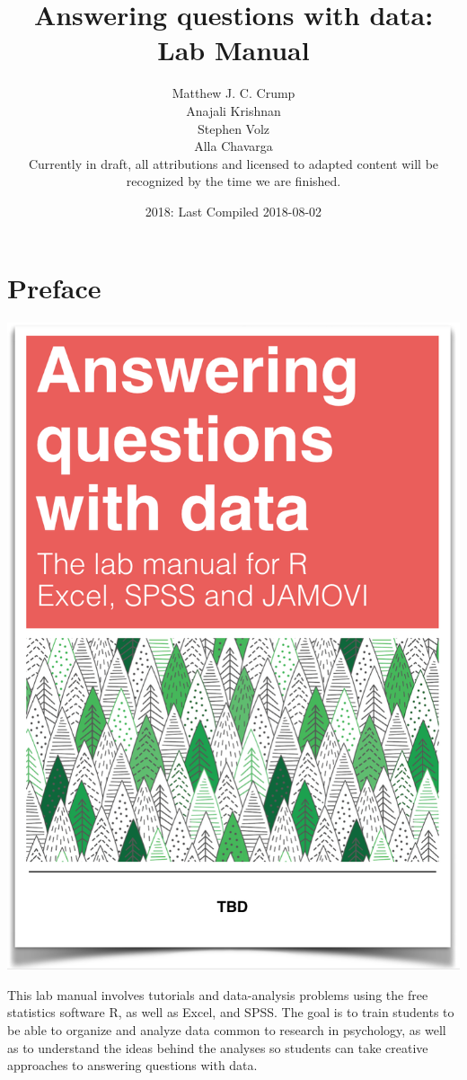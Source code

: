 \documentclass[]{book}
\title{Answering questions with data: Lab Manual}
\author{Matthew J. C. Crump \\ Anajali Krishnan \\ Stephen Volz \\ Alla Chavarga \\ Currently in draft, all attributions and licensed to adapted content
will be recognized by the time we are finished.}
\date{2018: Last Compiled 2018-08-02}
\theoremstyle{definition}
\theoremstyle{definition}
\theoremstyle{definition}
\theoremstyle{remark}
\begin{document}
\maketitle

{
\setcounter{tocdepth}{1}
\tableofcontents
}
\chapter*{Preface}\label{preface}

\begin{center}\includegraphics[width=12.5in]{LabmanualCover} \end{center}

This lab manual involves tutorials and data-analysis problems using the
free statistics software R, as well as Excel, and SPSS. The goal is to
train students to be able to organize and analyze data common to
research in psychology, as well as to understand the ideas behind the
analyses so students can take creative approaches to answering questions
with data.
\end{document}
